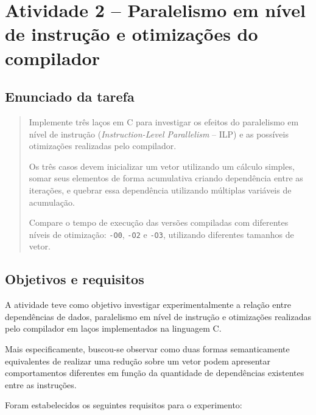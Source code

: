 \chapter{Atividade 2 -- Paralelismo em nível de instrução e otimizações do compilador}

\label{chap:atvd02}

\section{Enunciado da tarefa}

\label{sec:atvd02-enunciado}

\begin{quote}

Implemente três laços em C para investigar os efeitos do paralelismo em nível de instrução
(\textit{Instruction-Level Parallelism} -- ILP) e as possíveis otimizações realizadas pelo
compilador.

Os três casos devem inicializar um vetor utilizando um cálculo simples, somar seus elementos
de forma acumulativa criando dependência entre as iterações, e quebrar essa dependência
utilizando múltiplas variáveis de acumulação.

Compare o tempo de execução das versões compiladas com diferentes níveis de otimização:
\texttt{-O0}, \texttt{-O2} e \texttt{-O3}, utilizando diferentes tamanhos de vetor.

\end{quote}


\section{Objetivos e requisitos}

\label{sec:atvd02-objetivos}

A atividade teve como objetivo investigar experimentalmente a relação entre dependências de
dados, paralelismo em nível de instrução e otimizações realizadas pelo compilador em laços
implementados na linguagem C.

Mais especificamente, buscou-se observar como duas formas semanticamente equivalentes de
realizar uma redução sobre um vetor podem apresentar comportamentos diferentes em função da
quantidade de dependências existentes entre as instruções.

Foram estabelecidos os seguintes requisitos para o experimento:

